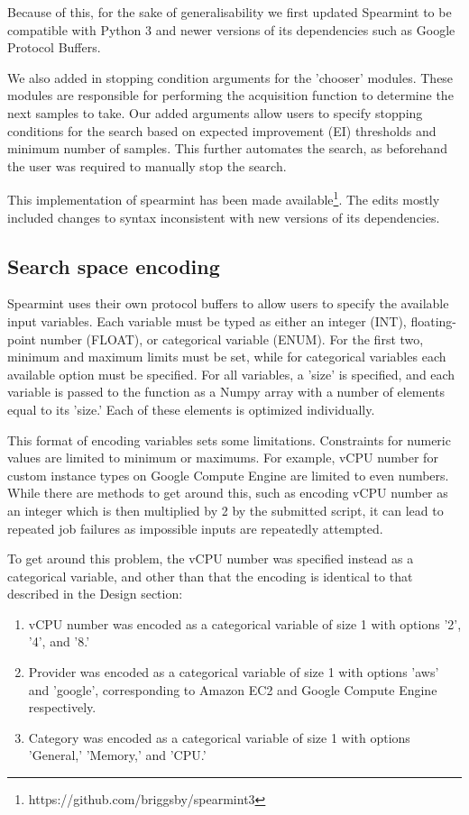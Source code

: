 \documentclass{report}
\begin{document}
Because of this, for the sake of generalisability we first updated Spearmint to be compatible with Python 3 and newer versions of its dependencies such as Google Protocol Buffers.

We also added in stopping condition arguments for the 'chooser' modules. These modules are responsible for performing the acquisition function to determine the next samples to take. Our added arguments allow users to specify stopping conditions for the search based on expected improvement (EI) thresholds and minimum number of samples. This further automates the search, as beforehand the user was required to manually stop the search.

This implementation of spearmint has been made available\footnote{https://github.com/briggsby/spearmint3}. The edits mostly included changes to syntax inconsistent with new versions of its dependencies.

\subsection{Search space encoding}
Spearmint uses their own protocol buffers to allow users to specify the available input variables. Each variable must be typed as either an integer (INT), floating-point number (FLOAT), or categorical variable (ENUM). For the first two, minimum and maximum limits must be set, while for categorical variables each available option must be specified. For all variables, a 'size' is specified, and each variable is passed to the function as a Numpy\cite{Klein2014} array with a number of elements equal to its 'size.' Each of these elements is optimized individually.

This format of encoding variables sets some limitations. Constraints for numeric values are limited to minimum or maximums. For example, vCPU number for custom instance types on Google Compute Engine are limited to even numbers. While there are methods to get around this, such as encoding vCPU number as an integer which is then multiplied by 2 by the submitted script, it can lead to repeated job failures as impossible inputs are repeatedly attempted.

To get around this problem, the vCPU number was specified instead as a categorical variable, and other than that the encoding is identical to that described in the Design section:
\begin{enumerate}
\item vCPU number was encoded as a categorical variable of size 1 with options '2', '4', and '8.' 
\item Provider was encoded as a categorical variable of size 1 with options 'aws' and 'google', corresponding to Amazon EC2 and Google Compute Engine respectively.
\item Category was encoded as a categorical variable of size 1 with options 'General,' 'Memory,' and 'CPU.'
\end{enumerate}
\end{document}
